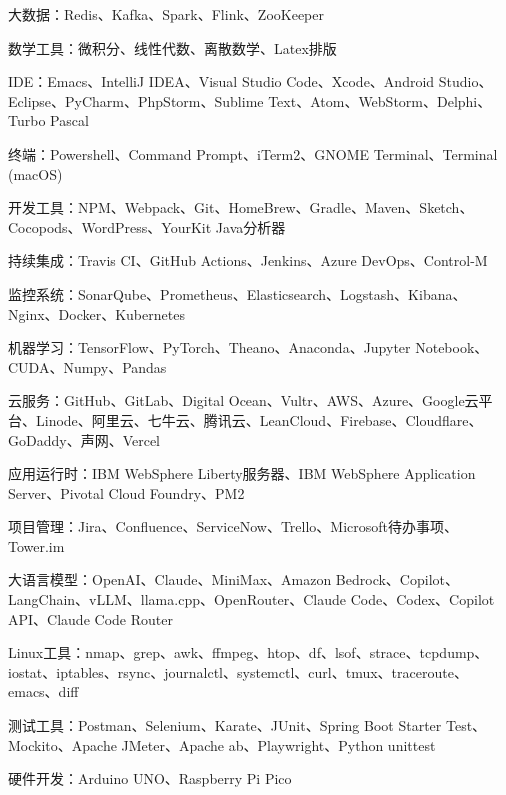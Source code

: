 \begin{cventries}
{\begin{cvitems}
        \item {大数据：Redis、Kafka、Spark、Flink、ZooKeeper}
        \item {数学工具：微积分、线性代数、离散数学、Latex排版}
        \item {IDE：Emacs、IntelliJ IDEA、Visual Studio Code、Xcode、Android Studio、Eclipse、PyCharm、PhpStorm、Sublime Text、Atom、WebStorm、Delphi、Turbo Pascal}
        \item {终端：Powershell、Command Prompt、iTerm2、GNOME Terminal、Terminal (macOS)}
        \item {开发工具：NPM、Webpack、Git、HomeBrew、Gradle、Maven、Sketch、Cocopods、WordPress、YourKit Java分析器}
        \item {持续集成：Travis CI、GitHub Actions、Jenkins、Azure DevOps、Control-M}
        \item {监控系统：SonarQube、Prometheus、Elasticsearch、Logstash、Kibana、Nginx、Docker、Kubernetes}
        \item {机器学习：TensorFlow、PyTorch、Theano、Anaconda、Jupyter Notebook、CUDA、Numpy、Pandas}
        \item {云服务：GitHub、GitLab、Digital Ocean、Vultr、AWS、Azure、Google云平台、Linode、阿里云、七牛云、腾讯云、LeanCloud、Firebase、Cloudflare、GoDaddy、声网、Vercel}
        \item {应用运行时：IBM WebSphere Liberty服务器、IBM WebSphere Application Server、Pivotal Cloud Foundry、PM2}
        \item {项目管理：Jira、Confluence、ServiceNow、Trello、Microsoft待办事项、Tower.im}
        \item {大语言模型：OpenAI、Claude、MiniMax、Amazon Bedrock、Copilot、LangChain、vLLM、llama.cpp、OpenRouter、Claude Code、Codex、Copilot API、Claude Code Router}
        \item {Linux工具：nmap、grep、awk、ffmpeg、htop、df、lsof、strace、tcpdump、iostat、iptables、rsync、journalctl、systemctl、curl、tmux、traceroute、emacs、diff}
        \item {测试工具：Postman、Selenium、Karate、JUnit、Spring Boot Starter Test、Mockito、Apache JMeter、Apache ab、Playwright、Python unittest}
        \item {硬件开发：Arduino UNO、Raspberry Pi Pico}
      \end{cvitems}
    }

\end{cventries}
